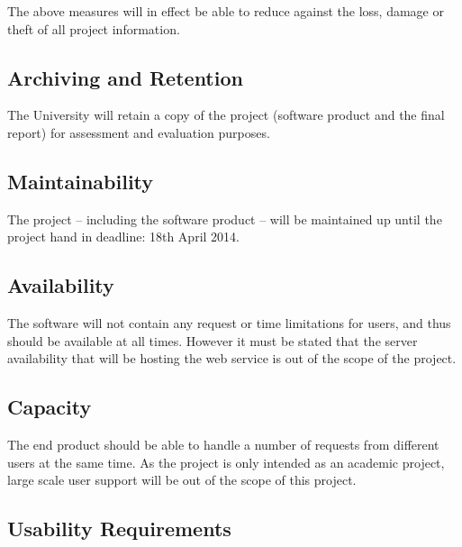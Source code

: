 The above measures will in effect be able to reduce against the loss, damage or 
theft of all project information.


\subsection{Archiving and Retention}

The University will retain a copy of the project (software product and the final
report) for assessment and evaluation purposes. 


\subsection{Maintainability}

The project -- including the software product -- will be maintained up until the
project hand in deadline: 18th April 2014.


\subsection{Availability}

The software will not contain any request or time limitations for users, and 
thus should be available at all times. However it must be stated that the server
availability that will be hosting the web service is out of the scope of the 
project.


\subsection{Capacity}

The end product should be able to handle a number of requests from different 
users at the same time. As the project is only intended as an academic project, 
large scale user support will be out of the scope of this project.


\subsection{Usability Requirements}

